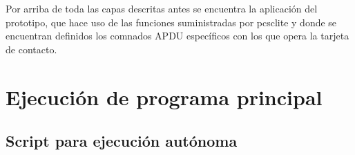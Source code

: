 \bigskip
{}
Por arriba de toda las capas descritas antes se encuentra la aplicación del prototipo, que hace uso de las funciones suministradas por pcsclite y donde se encuentran definidos los comnados APDU específicos con los que opera la tarjeta de contacto.

\section{Ejecución de programa principal}
\subsection{Script para ejecución autónoma}
